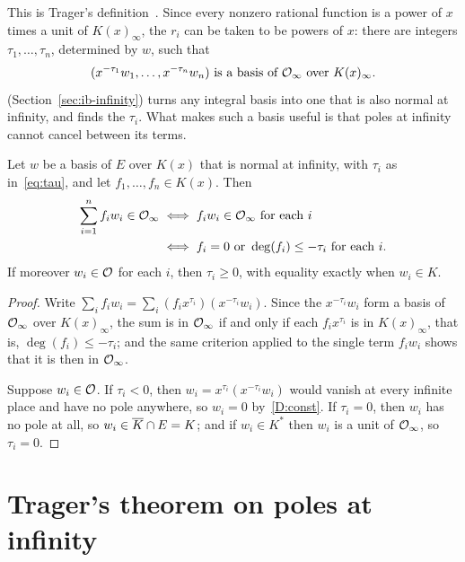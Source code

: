 This is Trager's definition~\cite[\S2.3]{trager1984}. Since every nonzero
rational function is a power of $x$ times a unit of $K(x)_\infty$, the $r_i$
can be taken to be powers of $x$: there are integers $\tau_1, \dots, \tau_n$,
determined by $w$, such that
\begin{equation}\label{eq:tau}
  (x^{-\tau_1} w_1, \dots, x^{-\tau_n} w_n)
  \text{ is a basis of } \mathcal{O}_\infty \text{ over } K(x)_\infty .
\end{equation}
 (Section~\ref{sec:ib-infinity}) turns any
integral basis into one that is also normal at infinity, and finds the
$\tau_i$. What makes
such a basis useful is that poles at infinity cannot cancel between its
terms.

\begin{lemma}\label{lem:termwise}
Let $w$ be a basis of $E$ over $K(x)$ that is normal at infinity, with
$\tau_i$ as in~\eqref{eq:tau}, and let $f_1, \dots, f_n \in K(x)$. Then
\begin{align*}
  \sum_{i=1}^n f_i w_i \in \mathcal{O}_\infty
  &\iff f_i w_i \in \mathcal{O}_\infty \text{ for each } i \\
  &\iff f_i = 0 \text{ or } \deg(f_i) \le -\tau_i \text{ for each } i .
\end{align*}
If moreover $w_i \in \mathcal{O}$ for each $i$, then $\tau_i \ge 0$, with equality
exactly when $w_i \in K$.
\end{lemma}

\begin{proof}
Write $\sum_i f_i w_i = \sum_i (f_i x^{\tau_i}) (x^{-\tau_i} w_i)$. Since the
$x^{-\tau_i} w_i$ form a basis of $\mathcal{O}_\infty$ over $K(x)_\infty$, the sum is
in $\mathcal{O}_\infty$ if and only if each $f_i x^{\tau_i}$ is in $K(x)_\infty$,
that is, $\deg(f_i) \le -\tau_i$; and the same criterion applied to the
single term $f_i w_i$ shows that it is then in $\mathcal{O}_\infty$.

Suppose $w_i \in \mathcal{O}$. If $\tau_i < 0$, then $w_i = x^{\tau_i} (x^{-\tau_i}
w_i)$ would vanish at every infinite place and have no pole anywhere, so
$w_i = 0$ by~\ref{D:const}. If $\tau_i = 0$, then $w_i$ has no pole at all, so
$w_i \in \overline{K} \cap E = K$; and if $w_i \in K^*$ then $w_i$ is a unit of
$\mathcal{O}_\infty$, so $\tau_i = 0$.
\end{proof}

\section{Trager's theorem on poles at infinity}\label{sec:algpart-trager}

